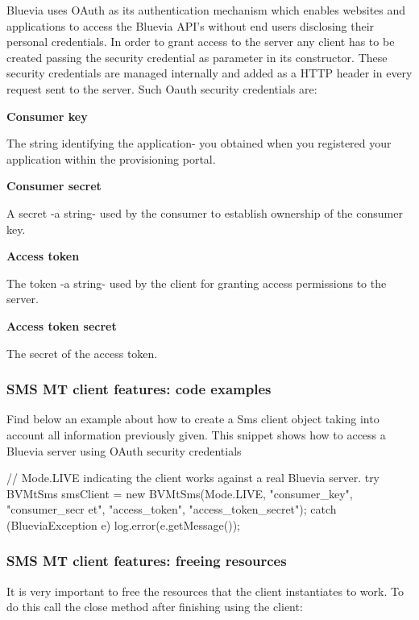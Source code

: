 Bluevia uses OAuth as its authentication mechanism which enables websites and applications to access the Bluevia API's without end users disclosing their personal credentials. In order to grant access to the server any client has to be created passing the security credential as parameter in its constructor. These security credentials are managed internally and added as a HTTP header in every request sent to the server. Such Oauth security credentials are: 
\begin{DoxyItemize}
\item {\bfseries Consumer key} \par
The string identifying the application-\/ you obtained when you registered your application within the provisioning portal.


\item {\bfseries Consumer secret} \par
A secret -\/a string-\/ used by the consumer to establish ownership of the consumer key.


\item {\bfseries Access token} \par
The token -\/a string-\/ used by the client for granting access permissions to the server.


\item {\bfseries Access token secret} \par
The secret of the access token. 
\end{DoxyItemize}\hypertarget{blv_sms_mt_guide_sms_mt_client_features_code_examples_sec}{}\subsubsection{SMS MT client features: code examples}\label{blv_sms_mt_guide_sms_mt_client_features_code_examples_sec}
Find below an example about how to create a Sms client object taking into account all information previously given. This snippet shows how to access a Bluevia server using OAuth security credentials


\begin{DoxyCode}
// Mode.LIVE indicating the client works against a real Bluevia server.
try {
        BVMtSms smsClient = new BVMtSms(Mode.LIVE, "consumer_key", "consumer_secr
      et", "access_token", "access_token_secret");
} catch (BlueviaException e){
        log.error(e.getMessage());
}
\end{DoxyCode}
\hypertarget{blv_sms_mt_guide_sms_mt_client_features_freeing_resources_sec}{}\subsubsection{SMS MT client features: freeing resources}\label{blv_sms_mt_guide_sms_mt_client_features_freeing_resources_sec}
It is very important to free the resources that the client instantiates to work. To do this call the close method after finishing using the client:


